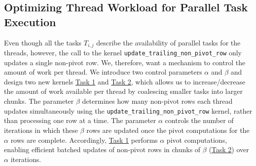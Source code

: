 \subsection{Optimizing Thread Workload for Parallel Task Execution}
Even though all the tasks $T_{i,j}$ describe the availability of parallel tasks for the threads, however, the call to the kernel \texttt{update\_trailing\_non\_pivot\_row} only updates a single non-pivot row. We, therefore, want a mechanism to control the amount of work per thread. We introduce two control parameters $\alpha$ and $\beta$ and design two new kernels \hyperref[alg:complete_task1]{Task 1} and \hyperref[alg:complete_task2]{Task 2}, which allows us to increase/decrease the amount of work available per thread by coalescing smaller tasks into larger chunks. The parameter $\beta$ determines how many non-pivot rows each thread updates simultaneously using the \texttt{update\_trailing\_non\_pivot\_row} kernel, rather than processing one row at a time. The parameter $\alpha$ controls the number of iterations in which these $\beta$ rows are updated once the pivot computations for the $\alpha$ rows are complete. Accordingly, \hyperref[alg:complete_task1]{Task 1} performs $\alpha$ pivot computations, enabling efficient batched updates of non-pivot rows in chunks of $\beta$ (\hyperref[alg:complete_task2]{Task 2}) over $\alpha$ iterations.

